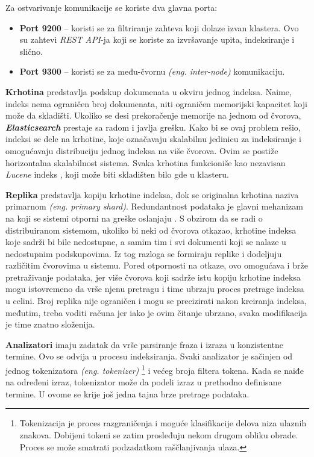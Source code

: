 \par
Za ostvarivanje komunikacije se koriste dva glavna porta:
\begin{itemize}
    \item \textbf{Port 9200} – koristi se za filtriranje zahteva koji dolaze izvan klastera. Ovo su zahtevi \textit{REST API}-ja koji se koriste za izvršavanje upita, indeksiranje i slično.
    \item \textbf{Port 9300} – koristi se za među-čvornu \textit{(eng. inter-node)} komunikaciju.
\end{itemize}

\par
\textbf{Krhotina} predstavlja podskup dokumenata u okviru jednog indeksa. Naime, indeks nema ograničen broj dokumenata, niti ograničen memorijski kapacitet koji može da skladišti. Ukoliko se desi prekoračenje memorije na jednom od čvorova, \textit{\textbf{Elasticsearch}} prestaje sa radom i javlja grešku. Kako bi se ovaj problem rešio, indeksi se dele na krhotine, koje označavaju skalabilnu jedinicu za indeksiranje i omogućavaju distribuciju jednog indeksa na više čvorova. Ovim se postiže horizontalna skalabilnost sistema. Svaka krhotina funkcioniše kao nezavisan \textit{Lucene} indeks \cite{apache-lucene}, koji može biti skladišten bilo gde u klasteru.

\par
\textbf{Replika} predstavlja kopiju krhotine indeksa, dok se originalna krhotina naziva primarnom \textit{(eng. primary shard)}. Redundantnost podataka je glavni mehanizam na koji se sistemi otporni na greške oslanjaju \cite{Sanders2019-hv}. S obzirom da se radi o distribuiranom sistemom, ukoliko bi neki od čvorova otkazao, krhotine indeksa koje sadrži bi bile nedostupne, a samim tim i svi dokumenti koji se nalaze u nedostupnim podskupovima. Iz tog razloga se formiraju replike i dodeljuju različitim čvorovima u sistemu. Pored otpornosti na otkaze, ovo omogućava i brže pretraživanje podataka, jer više čvorova koji sadrže istu kopiju krhotine indeksa mogu istovremeno da vrše njenu pretragu i time ubrzaju proces pretrage indeksa u celini. Broj replika nije ograničen i mogu se precizirati nakon kreiranja indeksa, međutim, treba voditi računa jer iako je ovim čitanje ubrzano, svaka modifikacija je time znatno složenija.

\par
\textbf{Analizatori} imaju zadatak da vrše parsiranje fraza i izraza u konzistentne termine. Ovo se odvija u procesu indeksiranja. Svaki analizator je sačinjen od jednog tokenizatora \textit{(eng. tokenizer)} \footnote{Tokenizacija je proces razgraničenja i moguće klasifikacije delova niza ulaznih znakova. Dobijeni tokeni se zatim prosleđuju nekom drugom obliku obrade. Proces se može smatrati podzadatkom raščlanjivanja ulaza.\cite{tokenization}} i većeg broja filtera tokena. Kada se naiđe na određeni izraz, tokenizator može da podeli izraz u prethodno definisane termine. U ovome se krije još jedna tajna brze pretrage podataka.
